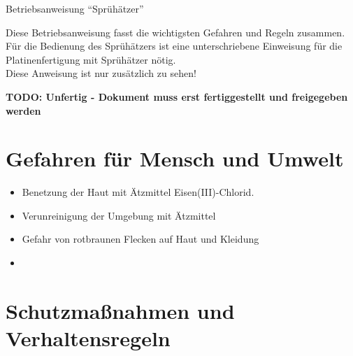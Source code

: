 \documentclass[fontsize=9pt]{scrartcl}
\newenvironment{smallitemize}{\begin{itemize}\itemsep -3pt}{\end{itemize}}
\begin{document}

\begin{center}
	\LARGE{Betriebsanweisung \enquote{Sprühätzer}}
\end{center}


\begin{center}
	Diese Betriebsanweisung fasst die wichtigsten Gefahren und Regeln zusammen.\\
	Für die Bedienung des Sprühätzers ist eine unterschriebene Einweisung für die Platinenfertigung mit Sprühätzer nötig.\\
	Diese Anweisung ist nur zusätzlich zu sehen!\\
\end{center}


{\LARGE \bfseries \color{red} TODO: Unfertig - Dokument muss erst fertiggestellt und freigegeben werden}
\section{Gefahren für Mensch und Umwelt}

\begin{smallitemize}
	\item Benetzung der Haut mit Ätzmittel Eisen(III)-Chlorid.
	\item Verunreinigung der Umgebung mit Ätzmittel
	\item Gefahr von rotbraunen Flecken auf Haut und Kleidung
	\item 
\end{smallitemize}

\section{Schutzmaßnahmen und Verhaltensregeln}
\end{document}
